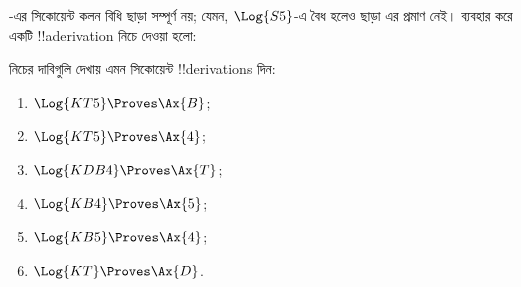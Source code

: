 \documentclass[../../../include/open-logic-section]{subfiles}
\begin{document}
\begin{ex}
-এর সিকোয়েন্ট কলন \Cut{}
বিধি ছাড়া সম্পূর্ণ নয়; যেমন,
 $\Log{S5}$-এ বৈধ হলেও
\Cut ছাড়া এর প্রমাণ নেই। \Cut ব্যবহার করে
একটি !!a{derivation} নিচে দেওয়া হলো:
\begin{prooftree}
\end{prooftree}
\end{ex}

\begin{prob}
নিচের দাবিগুলি দেখায় এমন সিকোয়েন্ট !!{derivation}s দিন:
  \begin{enumerate}
  \item $\Log{KT5} \Proves \Ax{B}$;
  \item $\Log{KT5} \Proves \Ax{4}$;
  \item $\Log{KDB4} \Proves \Ax{T}$;
  \item $\Log{KB4} \Proves \Ax{5}$;
  \item $\Log{KB5} \Proves \Ax{4}$;
  \item $\Log{KT} \Proves \Ax{D}$.
  \end{enumerate}
\end{prob}
\end{document}
